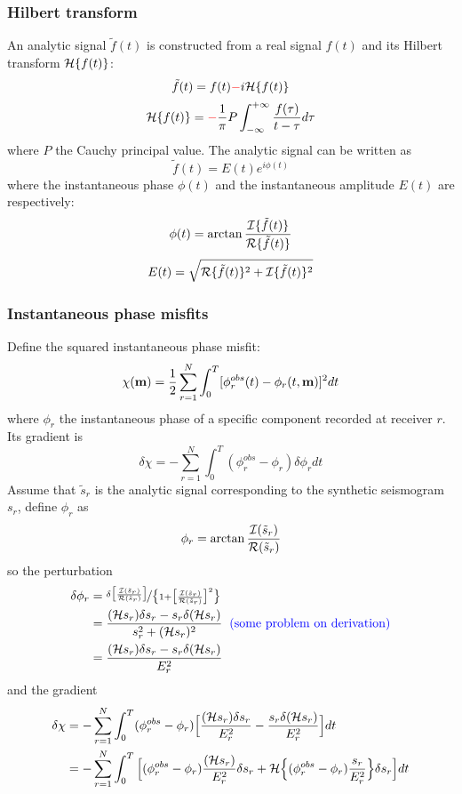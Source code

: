 \subsubsection{Hilbert transform}
An analytic signal $\tilde f(t)$ is constructed from a real signal $f(t)$ and its Hilbert transform $\mathcal{H}\{f(t)\}$:
\[ \tilde f(t)=f(t) {\color{red}-} i\mathcal{H}\{f(t)\} \]
\[ \mathcal{H}\{f(t)\}= {\color{red}-} \frac{1}{\pi}P\int_{-\infty}^{+\infty}\frac{f(\tau)}{t-\tau}d\tau \]
where $P$ the Cauchy principal value. The analytic signal can be written as
\[ \tilde f(t)=E(t)e^{i\phi(t)} \]
where the instantaneous phase $\phi(t)$ and the instantaneous amplitude $E(t)$ are respectively:
\[ \phi(t)=\arctan\frac{\mathcal{I}\{\tilde f(t)\}}{\mathcal{R}\{\tilde f(t)\}} \]
\[ E(t)=\sqrt{\mathcal{R}\{\tilde f(t)\}^2+\mathcal{I}\{\tilde f(t)\}^2} \]\par
\subsubsection{Instantaneous phase misfits}
Define the squared instantaneous phase misfit:
\[ \chi(\mathbf{m})=\frac{1}{2}\sum_{r=1}^N\int_0^T[\phi_r^{obs}(t)-\phi_r(t,\mathbf{m})]^2dt \]
where $\phi_r$ the instantaneous phase of a specific component recorded at receiver $r$. Its gradient is
\[ \delta\chi=-\sum_{r=1}^N\int_0^T(\phi_r^{obs}-\phi_r)\delta\phi_rdt \]
Assume that $\tilde s_r$ is the analytic signal corresponding to the synthetic seismogram $s_r$, define $\phi_r$ as
\[ \phi_r=\arctan\frac{\mathcal{I}(\tilde s_r)}{\mathcal{R}(\tilde s_r)} \]
so the perturbation
\begin{align*}
  \delta\phi_r & =\nicefrac{\delta\big[\frac{\mathcal{I}(\tilde s_r)}{\mathcal{R}(\tilde s_r)}\big]}{\big\{1+\big[\frac{\mathcal{I}(\tilde s_r)}{\mathcal{R}(\tilde s_r)}\big]^2\big\}} \\
    & =\frac{(\mathcal{H} s_r)\delta s_r-s_r\delta(\mathcal{H} s_r)}{s_r^2+(\mathcal{H} s_r)^2} {\color{blue}\text{\hspace{2mm}(some problem on derivation)}} \\
    & =\frac{(\mathcal{H} s_r)\delta s_r-s_r\delta(\mathcal{H} s_r)}{E_r^2} \\
\end{align*}
and the gradient
\begin{align*}
  \delta\chi & =-\sum_{r=1}^N\int_0^T(\phi_r^{obs}-\phi_r)\Big[\frac{(\mathcal{H} s_r)\delta s_r}{E_r^2}-\frac{s_r\delta(\mathcal{H} s_r)}{E_r^2}\Big]dt \\
    & =-\sum_{r=1}^N\int_0^T\Big[(\phi_r^{obs}-\phi_r)\frac{(\mathcal{H} s_r)}{E_r^2}\delta s_r+\mathcal{H}\Big\{(\phi_r^{obs}-\phi_r)\frac{s_r}{E_r^2}\Big\}\delta s_r\Big]dt \\
\end{align*}
